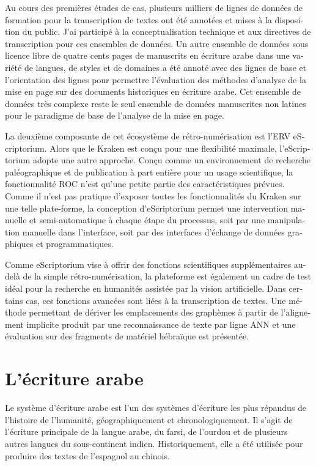 \begin{french}
Au cours des premières études de cas, plusieurs milliers de lignes de données
de formation pour la transcription de textes ont été annotées et mises à la
disposition du public. J'ai participé à la conceptualisation technique et aux
directives de transcription pour ces ensembles de données. Un autre ensemble de
données sous licence libre de quatre cents pages de manuscrits en écriture
arabe dans une variété de langues, de styles et de domaines a été annoté avec
des lignes de base et l'orientation des lignes pour permettre l'évaluation des
méthodes d'analyse de la mise en page sur des documents historiques en écriture
arabe.  Cet ensemble de données très complexe reste le seul ensemble de données
manuscrites non latines pour le paradigme de base de l'analyse de la mise en
page.

La deuxième composante de cet écosystème de rétro-numérisation est l'ERV
eScriptorium.  Alors que le Kraken est conçu pour une flexibilité maximale,
l'eScriptorium adopte une autre approche. Conçu comme un environnement de
recherche paléographique et de publication à part entière pour un usage
scientifique, la fonctionnalité ROC n'est qu'une petite partie des
caractéristiques prévues. Comme il n'est pas pratique d'exposer toutes les
fonctionnalités du Kraken sur une telle plate-forme, la conception
d'eScriptorium permet une intervention manuelle et semi-automatique à chaque
étape du processus, soit par une manipulation manuelle dans l'interface, soit
par des interfaces d'échange de données graphiques et programmatiques.

Comme eScriptorium vise à offrir des fonctions scientifiques supplémentaires
au-delà de la simple rétro-numérisation, la plateforme est également un cadre
de test idéal pour la recherche en humanités assistée par la vision
artificielle. Dans certains cas, ces fonctions avancées sont liées à la
transcription de textes. Une méthode permettant de dériver les emplacements des
graphèmes à partir de l'alignement implicite produit par une reconnaissance de
texte par ligne ANN et une évaluation sur des fragments de matériel hébraïque
est présentée.

\section{L'écriture arabe}

Le système d'écriture arabe est l'un des systèmes d'écriture les plus répandus
de l'histoire de l'humanité, géographiquement et chronologiquement. Il s'agit
de l'écriture principale de la langue arabe, du farsi, de l'ourdou et de
plusieurs autres langues du sous-continent indien. Historiquement, elle a été
utilisée pour produire des textes de l'espagnol au chinois.


\end{french}
